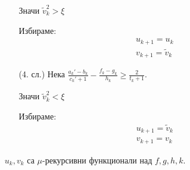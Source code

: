 \begin{solution}
\begin{itemize}
\begin{itemize}
                Значи $\tilde v_k^2 > \xi$
    
                Избираме:
                \begin{equation}
                    \begin{split}
                        u_{k+1} = u_k \\
                        v_{k+1} = \tilde v_k
                    \end{split}
                \end{equation}
            \item[(4. сл.)] Нека $\frac{a_k' - b_k}{c_k' + 1} - \frac{f_k - g_k}{h_k} \geq \frac{2}{t_k+1}$.
                
                Значи $\tilde v_k^2 < \xi$
    
                Избираме:
                \begin{equation}
                    \begin{split}
                        u_{k+1} = \tilde v_k \\
                        v_{k+1} = v_k
                    \end{split}
                \end{equation}
            \end{itemize}
        $u_k, v_k$ са $\mu$-рекурсивни функционали над $f,g,h,k$.
    \end{itemize}
\end{solution}

